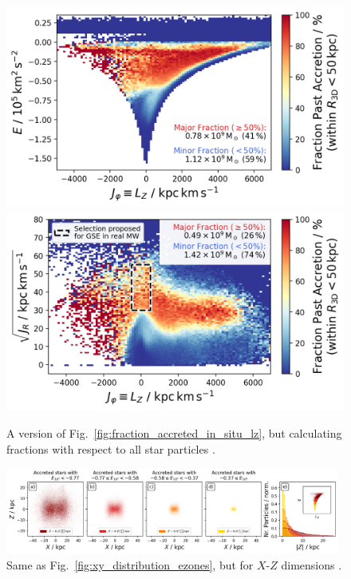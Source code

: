 \documentclass[fleqn,usenatbib]{mnras}
\begin{document}
\begin{figure}
    \centering
    \includegraphics[width=0.49\linewidth]{figures/fraction_accreted_in_situ_lz_e_total.png}
    \includegraphics[width=0.49\linewidth]{figures/fraction_accreted_in_situ_lz_jr_total.png}
    \caption{A version of Fig.~\ref{fig:fraction_accreted_in_situ_lz}, but calculating fractions with respect to all star particles \href{https://github.com/svenbuder/golden_thread_I/tree/main/figures}{\faGithub}.}
    \label{fig:fraction_accreted_in_situ_lz_total}
\end{figure}

\begin{figure}
    \centering
    \includegraphics[width=0.98\textwidth]{figures/xz_distribution_ezones.png}
    \caption{Same as Fig.~\ref{fig:xy_distribution_ezones}, but for $X$-$Z$ dimensions \href{https://github.com/svenbuder/golden_thread_I/tree/main/figures}{\faGithub}.}
    \label{fig:xz_distribution_ezones}
\end{figure}
\end{document}
